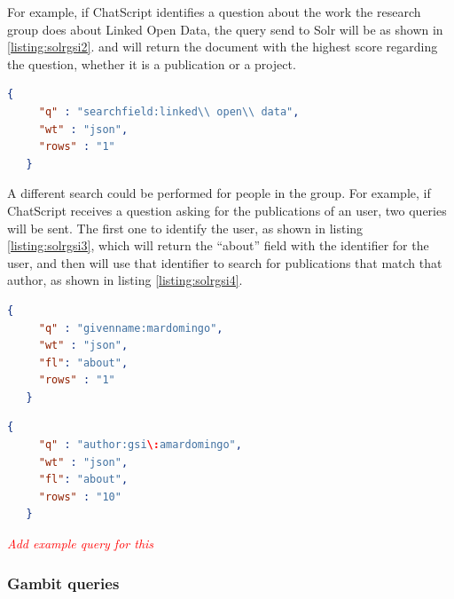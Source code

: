For example, if ChatScript identifies a question about the work the research group does about Linked Open Data, the query send to Solr will be as shown in \ref{listing:solrgsi2}. and will return the document with the highest score regarding the question, whether it is a publication or a project.

\begin{center} 
  \begin{lstlisting}[language=json, caption=Example query asking for Linked Open Data, label=listing:solrgsi2]
   {
     "q" : "searchfield:linked\\ open\\ data",
     "wt" : "json",
     "rows" : "1"
   }  
  \end{lstlisting}
\end{center}

A different search could be performed for people in the group. For example, if ChatScript receives a question asking for the publications of an user, two queries will be sent. The first one to identify the user, as shown in listing \ref{listing:solrgsi3}, which will return the ``about'' field with the identifier for the user, and then will use that identifier to search for publications that match that author, as shown in listing \ref{listing:solrgsi4}.

\begin{center} 
  \begin{lstlisting}[language=json, caption=Query asking for the data about an user, label=listing:solrgsi3]
   {
     "q" : "givenname:mardomingo",
     "wt" : "json",
     "fl": "about",
     "rows" : "1"
   }  
  \end{lstlisting}
\end{center}

\begin{center} 
  \begin{lstlisting}[language=json, caption=Query asking for the data about an user, label=listing:solrgsi4]
   {
     "q" : "author:gsi\:amardomingo",
     "wt" : "json",
     "fl": "about",
     "rows" : "10"
   }  
  \end{lstlisting}
\end{center}

\emph{\textcolor{red}{Add example query for this}}

\subsubsection{Gambit queries}

